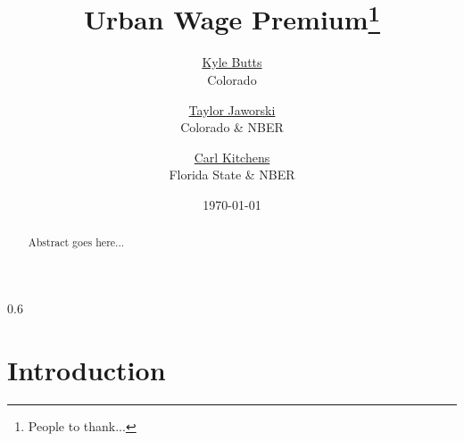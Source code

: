 \documentclass[12pt,twoside]{article}
\begin{document}



\begin{spacing}{0.6}
\begin{titlepage}

\title{Urban Wage Premium\thanks{People to thank...}}
\runningheads{}{}

\author{\footnotesize
    \href{https://www.kylebutts.com/}{Kyle 
    Butts}\\{\footnotesize Colorado} \and 
    \footnotesize\href{http://jaworskit.github.io}{Taylor 
    Jaworski}\\{\footnotesize Colorado \& NBER} \and 
    \footnotesize\href{https://sites.google.com/site/kitchct/}{Carl 
	Kitchens}\\{\footnotesize Florida State \& NBER}
}

\date{\small \today}
\maketitle
\thispagestyle{empty}
\setcounter{page}{0}


\begin{abstract}
   Abstract goes here...
\end{abstract}

\end{titlepage}
\end{spacing}


\section{Introduction}
\end{document}
